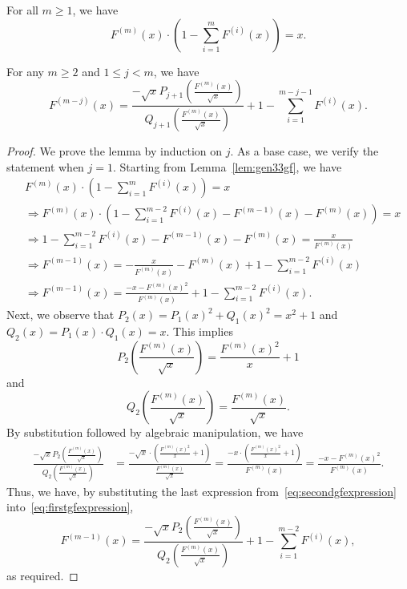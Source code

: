 \documentclass[10pt,a4paper]{amsart}
\newcommand{\gfnoa}[1]{F^{(#1)}(x)}
\begin{document}
\begin{lemma}\label{lem:gen33gf}
    For all $m\geq1$, we have
    \[
    \gfnoa{m}\cdot\left(1-\sum_{i=1}^{m}\gfnoa{i}\right)=x.
    \]
\end{lemma}

\begin{lemma}\label{lem:gen33}
    For any $m\geq2$ and $1\leq j<m$, we have
    \[
    \gfnoa{m-j}=\frac{-\sqrt{x}P_{j+1}\!\left(\frac{\gfnoa{m}}{\sqrt{x}}\right)}{Q_{j+1}\!\left(\frac{\gfnoa{m}}{\sqrt{x}}\right)}+1-\sum_{i=1}^{m-j-1}\gfnoa{i}.
    \]
\end{lemma}

\begin{proof}
    We prove the lemma by induction on $j$. As a base case, we verify the statement when $j=1$. Starting from Lemma~\ref{lem:gen33gf}, we have
    \begin{align}
        &\nonumber \gfnoa{m}\cdot\left(1-\sum_{i=1}^{m}\gfnoa{i}\right)=x\\
        &\nonumber \Rightarrow\gfnoa{m}\cdot\left(1-\sum_{i=1}^{m-2}\gfnoa{i}-\gfnoa{m-1}-\gfnoa{m}\right)=x\\
        &\nonumber \Rightarrow1-\sum_{i=1}^{m-2}\gfnoa{i}-\gfnoa{m-1}-\gfnoa{m}=\frac{x}{\gfnoa{m}}\\
        &\nonumber \Rightarrow\gfnoa{m-1}=-\frac{x}{\gfnoa{m}}-\gfnoa{m}+1-\sum_{i=1}^{m-2}\gfnoa{i}\\
        &\Rightarrow\gfnoa{m-1}=\frac{-x-\gfnoa{m}^2}{\gfnoa{m}}+1-\sum_{i=1}^{m-2}\gfnoa{i}\label{eq:firstgfexpression}.
    \end{align}
    Next, we observe that $P_2(x)=P_1(x)^2+Q_1(x)^2=x^2+1$ and $Q_2(x)=P_1(x)\cdot Q_1(x)=x$. This implies
    \[
    P_2\!\left(\frac{\gfnoa{m}}{\sqrt{x}}\right)=\frac{\gfnoa{m}^2}{x}+1
    \]
    and
    \[
    Q_2\!\left(\frac{\gfnoa{m}}{\sqrt{x}}\right)=\frac{\gfnoa{m}}{\sqrt{x}}.
    \]
    By substitution followed by algebraic manipulation, we have 
    \begin{align}
    \frac{-\sqrt{x}P_{2}\!\left(\frac{\gfnoa{m}}{\sqrt{x}}\right)}{Q_{2}\!\left(\frac{\gfnoa{m}}{\sqrt{x}}\right)}&=\frac{-\sqrt{x}\cdot\left(\frac{\gfnoa{m}^2}{x}+1\right)}{\frac{\gfnoa{m}}{\sqrt{x}}}
    =\frac{-x\cdot\left(\frac{\gfnoa{m}^2}{x}+1\right)}{\gfnoa{m}}
    =\frac{-x-\gfnoa{m}^2}{\gfnoa{m}}\label{eq:secondgfexpression}.
    \end{align}
    Thus, we have, by substituting the last expression from~\eqref{eq:secondgfexpression} into~\eqref{eq:firstgfexpression}, 
    \[
    \gfnoa{m-1}=\frac{-\sqrt{x}P_{2}\!\left(\frac{\gfnoa{m}}{\sqrt{x}}\right)}{Q_{2}\!\left(\frac{\gfnoa{m}}{\sqrt{x}}\right)}+1-\sum_{i=1}^{m-2}\gfnoa{i},
    \]
    as required.


\end{proof}
\end{document}
